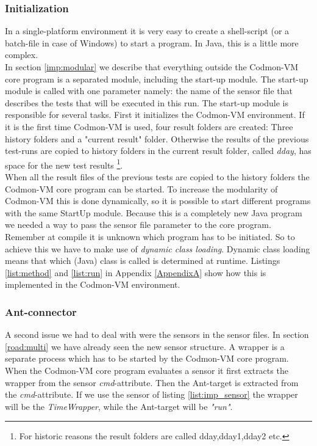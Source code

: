 \documentclass{article}
\newcommand{\project}{Codmon-VM}
\begin{document}
\subsubsection{Initialization}
\label{imp:start}
In a single-platform environment it is very easy to create a shell-script (or a batch-file in case of Windows) to start a program. In Java, this is a little more complex.\\

\noindent In section \ref{imp:modular} we describe that everything outside the \project{} core program is a separated module, including the start-up module. The start-up module is called with one parameter namely: 
the name of the sensor file that describes the tests that will be executed in this run. The start-up module is responsible for several tasks. First it initializes the \project{} environment. If it is the 
first time \project{} is used, four result folders are created: Three history folders and a "current result" folder. Otherwise the results of the previous test-runs are copied to history folders in the 
current result folder, called \emph{dday}, has space for the new test results \footnote{For historic reasons the result folders are called dday,dday1,dday2 etc.}.\\

\noindent When all the result files of the previous tests are copied to the history folders the \project{} core program can be started. To increase the modularity of \project{} this is done dynamically, so 
it is possible to start different programs with the same StartUp module. Because this is a completely new Java program we needed a way to pass the sensor file parameter to the core program. Remember at 
compile it is unknown which program has to be initiated. So to achieve this we have to make use of \emph{dynamic class loading}. Dynamic class loading means that which (Java) class is called is determined 
at runtime. Listings \ref{list:method} and \ref{list:run} in Appendix \ref{AppendixA} show how this is implemented in the \project{} environment.


\subsubsection{Ant-connector}
\label{imp:ant}
A second issue we had to deal with were the sensors in the sensor files. In section \ref{road:multi} we have already seen the new sensor structure. A wrapper is a separate process which has to be started by 
the \project{} core program.  When the \project{} core program evaluates a sensor it first extracts the wrapper from the sensor \emph{cmd}-attribute. Then the Ant-target is extracted from the 
\emph{cmd}-attribute. If we use the sensor of listing \ref{list:imp_sensor} the wrapper will be the \emph{TimeWrapper}, while the Ant-target will be \emph{"run"}.\\
\end{document}
